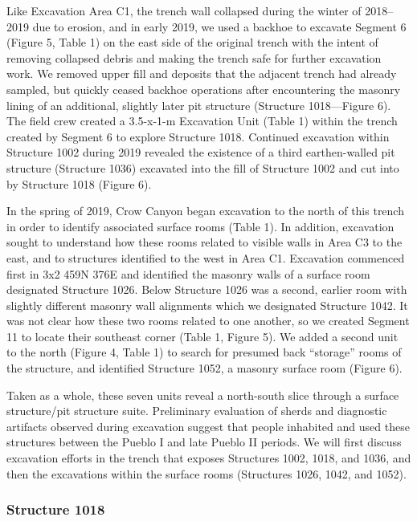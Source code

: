 \documentclass[
  12pt,
]{krantz}
\begin{document}
Like Excavation Area C1, the trench wall collapsed during the winter of
2018--2019 due to erosion, and in early 2019, we used a backhoe to
excavate Segment 6 (Figure 5, Table 1) on the east side of the original
trench with the intent of removing collapsed debris and making the
trench safe for further excavation work. We removed upper fill and
deposits that the adjacent trench had already sampled, but quickly
ceased backhoe operations after encountering the masonry lining of an
additional, slightly later pit structure (Structure 1018---Figure 6).
The field crew created a 3.5-x-1-m Excavation Unit (Table 1) within the
trench created by Segment 6 to explore Structure 1018. Continued
excavation within Structure 1002 during 2019 revealed the existence of a
third earthen-walled pit structure (Structure 1036) excavated into the
fill of Structure 1002 and cut into by Structure 1018 (Figure 6).

In the spring of 2019, Crow Canyon began excavation to the north of this
trench in order to identify associated surface rooms (Table 1). In
addition, excavation sought to understand how these rooms related to
visible walls in Area C3 to the east, and to structures identified to
the west in Area C1. Excavation commenced first in 3x2 459N 376E and
identified the masonry walls of a surface room designated Structure
1026. Below Structure 1026 was a second, earlier room with slightly
different masonry wall alignments which we designated Structure 1042. It
was not clear how these two rooms related to one another, so we created
Segment 11 to locate their southeast corner (Table 1, Figure 5). We
added a second unit to the north (Figure 4, Table 1) to search for
presumed back ``storage'' rooms of the structure, and identified Structure
1052, a masonry surface room (Figure 6).

Taken as a whole, these seven units reveal a north-south slice through a
surface structure/pit structure suite. Preliminary evaluation of sherds
and diagnostic artifacts observed during excavation suggest that people
inhabited and used these structures between the Pueblo I and late Pueblo
II periods. We will first discuss excavation efforts in the trench that
exposes Structures 1002, 1018, and 1036, and then the excavations within
the surface rooms (Structures 1026, 1042, and 1052).

\hypertarget{structure-1018}{%
\subsubsection{Structure 1018}\label{structure-1018}}
\end{document}
